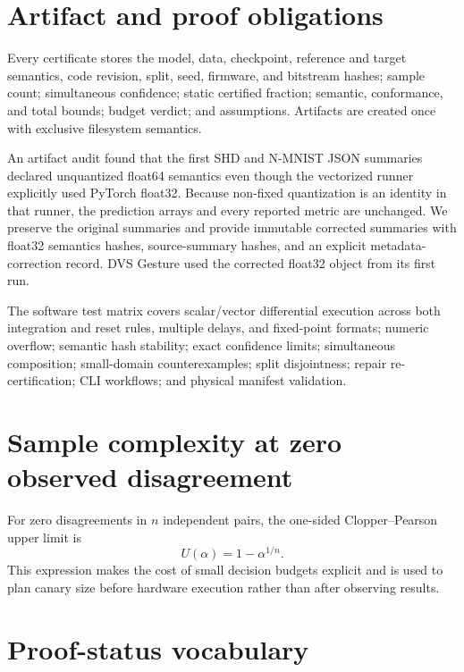 \section{Artifact and proof obligations}

Every certificate stores the model, data, checkpoint, reference and target
semantics, code revision, split, seed, firmware, and bitstream hashes; sample
count; simultaneous confidence; static certified fraction; semantic,
conformance, and total bounds; budget verdict; and assumptions. Artifacts are
created once with exclusive filesystem semantics.

An artifact audit found that the first SHD and N-MNIST JSON summaries declared
unquantized float64 semantics even though the vectorized runner explicitly used
PyTorch float32. Because non-fixed quantization is an identity in that runner,
the prediction arrays and every reported metric are unchanged. We preserve the
original summaries and provide immutable corrected summaries with float32
semantics hashes, source-summary hashes, and an explicit metadata-correction
record. DVS Gesture used the corrected float32 object from its first run.

The software test matrix covers scalar/vector differential execution across both
integration and reset rules, multiple delays, and fixed-point formats; numeric
overflow; semantic hash stability; exact confidence limits; simultaneous
composition; small-domain counterexamples; split disjointness; repair
re-certification; CLI workflows; and physical manifest validation.

\section{Sample complexity at zero observed disagreement}

For zero disagreements in $n$ independent pairs, the one-sided
Clopper--Pearson upper limit is
\begin{equation}
U(\alpha)=1-\alpha^{1/n}.
\end{equation}
This expression makes the cost of small decision budgets explicit and is used to
plan canary size before hardware execution rather than after observing results.

\section{Proof-status vocabulary}


